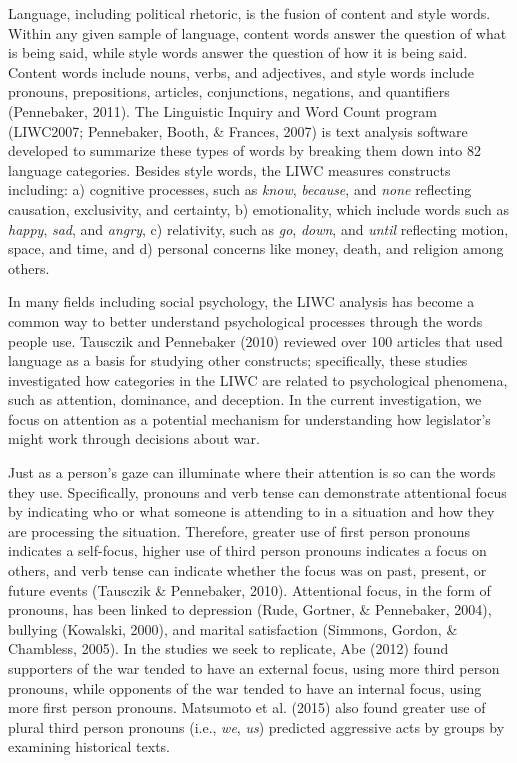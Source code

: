 \documentclass[english,,man,floatsintext]{apa6}
\begin{document}
Language, including political rhetoric, is the fusion of content and style words. Within any given sample of language, content words answer the question of what is being said, while style words answer the question of how it is being said. Content words include nouns, verbs, and adjectives, and style words include pronouns, prepositions, articles, conjunctions, negations, and quantifiers (Pennebaker, 2011). The Linguistic Inquiry and Word Count program (LIWC2007; Pennebaker, Booth, \& Frances, 2007) is text analysis software developed to summarize these types of words by breaking them down into 82 language categories. Besides style words, the LIWC measures constructs including: a) cognitive processes, such as \emph{know}, \emph{because}, and \emph{none} reflecting causation, exclusivity, and certainty, b) emotionality, which include words such as \emph{happy}, \emph{sad}, and \emph{angry}, c) relativity, such as \emph{go}, \emph{down}, and \emph{until} reflecting motion, space, and time, and d) personal concerns like money, death, and religion among others.

In many fields including social psychology, the LIWC analysis has become a common way to better understand psychological processes through the words people use. Tausczik and Pennebaker (2010) reviewed over 100 articles that used language as a basis for studying other constructs; specifically, these studies investigated how categories in the LIWC are related to psychological phenomena, such as attention, dominance, and deception. In the current investigation, we focus on attention as a potential mechanism for understanding how legislator's might work through decisions about war.

Just as a person's gaze can illuminate where their attention is so can the words they use. Specifically, pronouns and verb tense can demonstrate attentional focus by indicating who or what someone is attending to in a situation and how they are processing the situation. Therefore, greater use of first person pronouns indicates a self-focus, higher use of third person pronouns indicates a focus on others, and verb tense can indicate whether the focus was on past, present, or future events (Tausczik \& Pennebaker, 2010). Attentional focus, in the form of pronouns, has been linked to depression (Rude, Gortner, \& Pennebaker, 2004), bullying (Kowalski, 2000), and marital satisfaction (Simmons, Gordon, \& Chambless, 2005). In the studies we seek to replicate, Abe (2012) found supporters of the war tended to have an external focus, using more third person pronouns, while opponents of the war tended to have an internal focus, using more first person pronouns. Matsumoto et al. (2015) also found greater use of plural third person pronouns (i.e., \emph{we}, \emph{us}) predicted aggressive acts by groups by examining historical texts.
\end{document}
